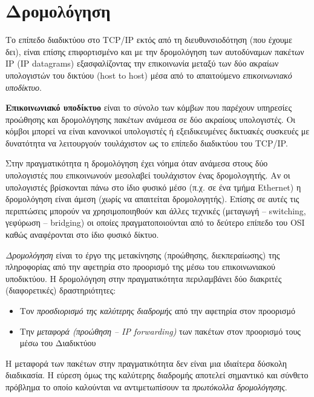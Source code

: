 %
%
\setcounter{section}{5}
\section{Δρομολόγηση}

Το επίπεδο διαδικτύου στο TCP/IP εκτός από τη διευθυνσιοδότηση (που έχουμε δει), είναι επίσης επιφορτισμένο και με την δρομολόγηση των αυτοδύναμων πακέτων IP (IP datagrams) εξασφαλίζοντας την επικοινωνία μεταξύ των δύο ακραίων υπολογιστών του δικτύου (host to host) μέσα από το απαιτούμενο \emph{επικοινωνιακό υποδίκτυο}.

\begin{inthebox}
\textbf{Επικοινωνιακό υποδίκτυο} είναι το σύνολο των κόμβων που παρέχουν υπηρεσίες προώθησης και δρομολόγησης πακέτων ανάμεσα σε δύο ακραίους υπολογιστές. Οι κόμβοι μπορεί να είναι κανονικοί υπολογιστές ή εξειδικευμένες δικτυακές συσκευές με δυνατότητα να λειτουργούν τουλάχιστον ως το επίπεδο διαδικτύου του TCP/IP.\\
\end{inthebox}

Στην πραγματικότητα η δρομολόγηση έχει νόημα όταν ανάμεσα στους δύο υπολογιστές που επικοινωνούν μεσολαβεί τουλάχιστον ένας δρομολογητής. Αν οι υπολογιστές βρίσκονται πάνω στο ίδιο φυσικό μέσο (π.χ. σε ένα τμήμα Ethernet) η δρομολόγηση είναι άμεση (χωρίς να απαιτείται δρομολογητής). Επίσης σε αυτές τις περιπτώσεις μπορούν να χρησιμοποιηθούν και άλλες τεχνικές (μεταγωγή -- switching, γεφύρωση -- bridging) οι οποίες πραγματοποιούνται από το δεύτερο επίπεδο του OSI καθώς αναφέρονται στο ίδιο φυσικό δίκτυο. 

\emph{Δρομολόγηση} είναι το έργο της μετακίνησης (προώθησης, διεκπεραίωσης) της πληροφορίας από την αφετηρία στο προορισμό της μέσω του επικοινωνιακού υποδικτύου. Η δρομολόγηση στην πραγματικότητα περιλαμβάνει δύο διακριτές (διαφορετικές) δραστηριότητες:

\begin{itemize}
\item Τον \emph{προσδιορισμό της καλύτερης διαδρομής} από την αφετηρία στον προορισμό
\item Την \emph{μεταφορά (προώθηση -- IP forwarding)} των πακέτων στον προορισμό τους μέσω του Διαδικτύου
\end{itemize}

Η μεταφορά των πακέτων στην πραγματικότητα δεν είναι μια ιδιαίτερα δύσκολη διαδικασία. Η εύρεση όμως της καλύτερης διαδρομής αποτελεί σημαντικό και σύνθετο πρόβλημα το οποίο καλούνται να αντιμετωπίσουν τα \emph{πρωτόκολλα δρομολόγησης}. 

